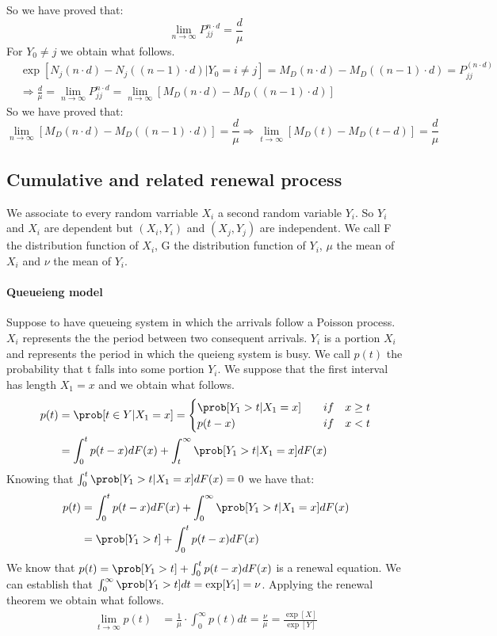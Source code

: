 So we have proved that:
\begin{equation}
	\lim_{n \to \infty} P_{jj}^{n \cdot d}=\frac{d}{\mu}
\end{equation}
For $Y_0 \neq j$ we obtain what follows.
\begin{align*}
	& \exp[N_j(n \cdot d)-N_j((n-1) \cdot d)|Y_0=i \neq j]=M_D(n \cdot d)-M_D((n-1) \cdot d)=P_{jj}^{(n \cdot d)}
	\\ & \Rightarrow \frac{d}{\mu}=\lim_{n \to \infty} P_{jj}^{n \cdot d} = \lim_{n \to \infty} [M_D(n \cdot d)-M_D((n-1) \cdot d)]
\end{align*}
So we have proved that:
\begin{equation}
	\lim_{n \to \infty} [M_D(n \cdot d)-M_D((n-1) \cdot d)]=\frac{d}{\mu} \Rightarrow \lim_{t \to \infty }[M_D(t)-M_D(t-d)]=\frac{d}{\mu}
\end{equation}

\subsection{Cumulative and related renewal process}
We associate to every random varriable $X_i$ a second random variable $Y_i$. So $Y_i$ and $X_i$ are dependent but $(X_i,Y_i)$ and $(X_j,Y_j)$ are independent. We call F the distribution function of $X_i$, G the distribution function of $Y_i$, $\mu$ the mean of $X_i$ and $\nu$ the mean of $Y_i$.
\paragraph{Queueieng model}
Suppose to have queueing system in which the arrivals follow a Poisson process. $X_i$ represents the the period between two consequent arrivals. $Y_i$ is a portion $X_i$ and represents the period in which the queieng system is busy. We call $p(t)$ the probability that t falls into some portion $Y_i$. We suppose that the first interval has length $X_1=x$ and we obtain what follows.
\begin{align*}
	p(t) & =\prob[t \in Y |X_1 = x]=\begin{cases}
		\prob[Y_1>t|X_1=x] \quad & if \quad x \geq t
		\\ p(t-x) \quad & if \quad x<t
	\end{cases}
	\\ & = \int_0^t p(t-x)dF(x)+\int_t^{\infty}\prob[Y_1>t|X_1=x]dF(x)
\end{align*}
Knowing that $\int_0^{t}\prob[Y_1>t|X_1=x]dF(x)=0$ we have that:
\begin{align*}
	p(t) & = \int_0^t p(t-x)dF(x)+\int_0^{\infty}\prob[Y_1>t|X_1=x]dF(x)
	\\ & = \prob[Y_1>t]+\int_0^t p(t-x)dF(x)
\end{align*}
We know that $p(t)= \prob[Y_1>t]+\int_0^t p(t-x)dF(x)$ is a renewal equation. We can establish that $\int_0^{\infty}\prob[Y_1>t]dt=\exp[Y_1]=\nu$. Applying the renewal theorem we obtain what follows.
\begin{align*}
	\lim_{t \to \infty} p(t) & = \frac{1}{\mu}\cdot\int_0^{\infty}p(t)dt = \frac{\nu}{\mu}= \frac{\exp[X]}{\exp[Y]}
\end{align*}

